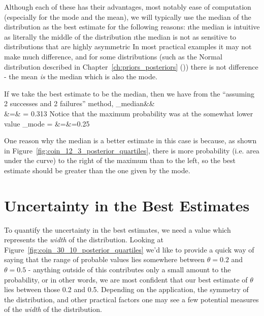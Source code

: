 Although each of these has their advantages, most notably ease of computation (especially for the mode and the mean), we will typically use the median of the distribution as the best estimate for the following reasons:
\be
\i the median is intuitive as literally the middle of the distribution
\i the median is not as sensitive to distributions that are highly asymmetric
\ee
In most practical examples it may not make much difference, and for some distributions (such as the Normal distribution described in Chapter~\ref{ch:priors_posteriors} (\emph{})) there is not difference - the mean \emph{is} the median which is also the mode.


If we take the best estimate to be the median, then we have from the ``assuming 2 successes and 2 failures'' method,
\beqn
\hat{\theta}_{\rm median}&\approx& \\
&=& = 0.313
\eeqn
Notice that the maximum probability was at the somewhat lower value
\beqn
\hat{\theta}_{\rm mode} = &=&=0.25
\eeqn

One reason why the median is a better estimate in this case is because, as shown in Figure~\ref{fig:coin_12_3_posterior_quartiles}, there is more probability (i.e. area under the curve) to the right of the maximum than to the left, so the best estimate should be greater than the one given by the mode.

\section{Uncertainty in the Best Estimates}

To quantify the uncertainty in the best estimates, we need a value which represents the \emph{width} of the distribution.  Looking at Figure~\ref{fig:coin_30_10_posterior_quartiles} we'd like to provide a quick way of saying that the range of probable values lies somewhere between $\theta=0.2$ and $\theta=0.5$ - anything outside of this contributes only a small amount to the probability, or in other words, we are most confident that our best estimate of $\theta$ lies between those 0.2 and 0.5.  Depending on the application, the symmetry of the distribution, and other practical factors one may see a few potential measures of the \emph{width} of the distribution.

